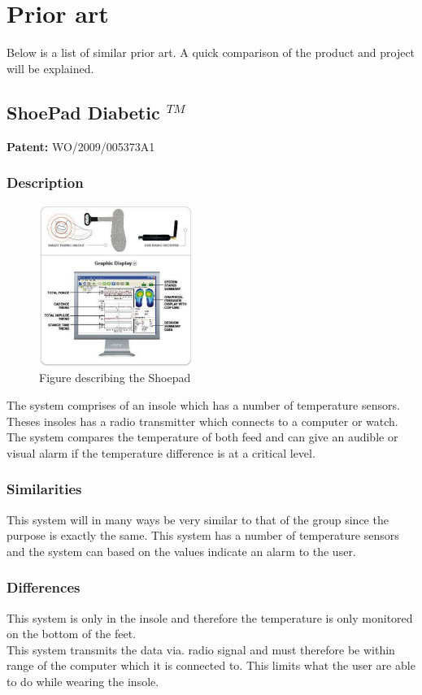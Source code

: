 \section{Prior art}
Below is a list of similar prior art. A quick comparison of the product and project will be explained.
\subsection{ShoePad Diabetic $^{TM}$}
\textbf{Patent:} WO/2009/005373A1
\subsubsection{Description}
\begin{figure}
\includegraphics[width=5cm]{billeder/shoepad}
\caption{Figure describing the Shoepad}
\end{figure}
The system comprises of an insole which has a number of temperature sensors. Theses insoles has a radio transmitter which connects to a computer or watch. The system compares the temperature of both feed and can give an audible or visual alarm if the temperature difference is at a critical level.
\subsubsection{Similarities}
This system will in many ways be very similar to that of the group since the purpose is exactly the same. This system has a number of temperature sensors and the system can based on the values indicate an alarm to the user.
\subsubsection{Differences}
This system is only in the insole and therefore the temperature is only monitored on the bottom of the feet.\\
This system transmits the data via. radio signal and must therefore be within range of the computer which it is connected to. This limits what the user are able to do while wearing the insole.


